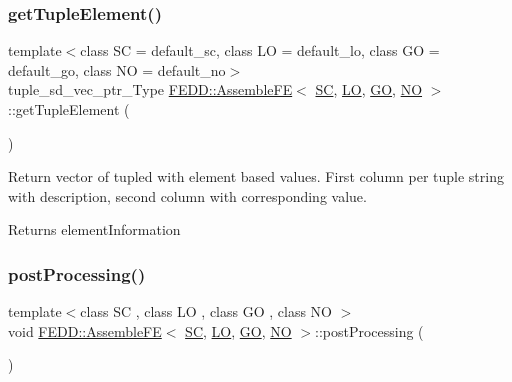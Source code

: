 \subsubsection{\texorpdfstring{get\+Tuple\+Element()}{getTupleElement()}}
{\footnotesize\ttfamily template$<$class SC  = default\+\_\+sc, class LO  = default\+\_\+lo, class GO  = default\+\_\+go, class NO  = default\+\_\+no$>$ \\
tuple\+\_\+sd\+\_\+vec\+\_\+ptr\+\_\+\+Type \hyperlink{classFEDD_1_1AssembleFE}{F\+E\+D\+D\+::\+Assemble\+FE}$<$ \hyperlink{fe__test__laplace_8cpp_a79c7e86a57edbb2a5a53242bcd04e41e}{SC}, \hyperlink{fe__test__laplace_8cpp_ad6a38c9f07d3fd633eefca5bccad8410}{LO}, \hyperlink{fe__test__laplace_8cpp_afa2946b509009b4f45eb04bd8c5b27d9}{GO}, \hyperlink{fe__test__laplace_8cpp_a5e24f37b28787429872b6ecb1d0417ce}{NO} $>$\+::get\+Tuple\+Element (\begin{DoxyParamCaption}{ }\end{DoxyParamCaption})\hspace{0.3cm}{\ttfamily [inline]}}



Return vector of tupled with element based values. First column per tuple string with description, second column with corresponding value. 

\begin{DoxyReturn}{Returns}
element\+Information 
\end{DoxyReturn}
\mbox{\label{classFEDD_1_1AssembleFE_a8ae32f71020082d81b055afbeda6fc29}} 
\subsubsection{\texorpdfstring{post\+Processing()}{postProcessing()}}
{\footnotesize\ttfamily template$<$class SC , class LO , class GO , class NO $>$ \\
void \hyperlink{classFEDD_1_1AssembleFE}{F\+E\+D\+D\+::\+Assemble\+FE}$<$ \hyperlink{fe__test__laplace_8cpp_a79c7e86a57edbb2a5a53242bcd04e41e}{SC}, \hyperlink{fe__test__laplace_8cpp_ad6a38c9f07d3fd633eefca5bccad8410}{LO}, \hyperlink{fe__test__laplace_8cpp_afa2946b509009b4f45eb04bd8c5b27d9}{GO}, \hyperlink{fe__test__laplace_8cpp_a5e24f37b28787429872b6ecb1d0417ce}{NO} $>$\+::post\+Processing (\begin{DoxyParamCaption}{ }\end{DoxyParamCaption})}



